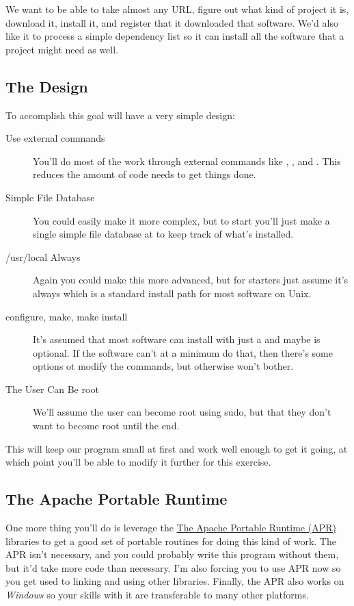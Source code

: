We want  to be able to take almost any URL, figure
out what kind of project it is, download it, install it, and register
that it downloaded that software.  We'd also like it to process a
simple dependency list so it can install all the software that a
project might need as well.

\subsection{The Design}

To accomplish this goal  will have a very simple design:

\begin{description}
\item[Use external commands] You'll do most of the work through external
    commands like , , and .  This
    reduces the amount of code  needs to get things done.
\item[Simple File Database] You could easily make it more complex, but to
    start you'll just make a single simple file database at
     to keep track of what's installed.
\item[/usr/local Always] Again you could make this more advanced, but for
    starters just assume it's always  which is a standard
    install path for most software on Unix.
\item[configure, make, make install] It's assumed that most software can
    install with just a  and maybe
     is optional.  If the software can't at a minimum
    do that, then there's some options ot modify the commands, but otherwise
     won't bother.
\item[The User Can Be root] We'll assume the user can become root using
    sudo, but that they don't want to become root until the end.
\end{description}

This will keep our program small at first and work well enough to get it
going, at which point you'll be able to modify it further for this exercise.


\subsection{The Apache Portable Runtime}

One more thing you'll do is leverage the \href{http://apr.apache.org/}{The
Apache Portable Runtime (APR)} libraries to get a good set of portable routines
for doing this kind of work.  The APR isn't necessary, and you could probably
write this program without them, but it'd take more code than necessary.
I'm also forcing you to use APR now so you get used to linking and using
other libraries.  Finally, the APR also works on \emph{Windows} so your
skills with it are transferable to many other platforms.

